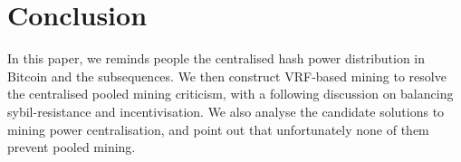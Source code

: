\section{Conclusion}

In this paper, we reminds people the centralised hash power distribution in Bitcoin and the subsequences.
We then construct VRF-based mining to resolve the centralised pooled mining criticism,
with a following discussion on balancing sybil-resistance and incentivisation.
We also analyse the candidate solutions to mining power centralisation, and point out that unfortunately none of them prevent pooled mining.